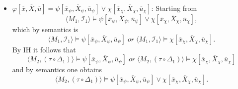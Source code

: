 \documentclass[11pt,a4paper]{article}
\newcommand{\sor}{ \; or \;}
\begin{document}
\begin{itemize}[leftmargin=*]
\item $\varphi[\overline{x}, \overline{X}, \overline{u}] = \psi[\overline{x}_{\psi}, \overline{X}_{\psi}, \overline{u}_{\psi}] \lor \chi[\overline{x}_{\chi}, \overline{X}_{\chi}, \overline{u}_{\chi}]$: 
Starting from 
\begin{equation*}
\langle M_1, \mathcal{I}_1 \rangle \models \psi[\overline{x}_{\psi}, \overline{X}_{\psi}, \overline{u}_{\psi}] \lor \chi[\overline{x}_{\chi}, \overline{X}_{\chi}, \overline{u}_{\chi}],
\end{equation*}
which by semantics is 
\begin{equation*}
\langle M_1, \mathcal{I}_1 \rangle \models \psi[\overline{x}_{\psi}, \overline{X}_{\psi}, \overline{u}_{\psi}] \sor \langle M_1, \mathcal{I}_1 \rangle \models \chi[\overline{x}_{\chi}, \overline{X}_{\chi}, \overline{u}_{\chi}].
\end{equation*}
By IH it follows that  
\begin{equation*}
\langle M_2, (\tau \circ \Delta_1) \rangle \models \psi[\overline{x}_{\psi}, \overline{X}_{\psi}, \overline{u}_{\psi}] \sor\langle M_2, (\tau \circ \Delta_1) \rangle \models \chi[\overline{x}_{\chi}, \overline{X}_{\chi}, \overline{u}_{\chi}]
\end{equation*}
and by semantics one obtains 
\begin{equation*}
\langle M_2, (\tau \circ \Delta_1) \rangle \models \psi[\overline{x}_{\psi}, \overline{X}_{\psi}, \overline{u}_{\psi}] \lor \chi[\overline{x}_{\chi}, \overline{X}_{\chi}, \overline{u}_{\chi}].
\end{equation*}\\



\end{itemize}
\end{document}
